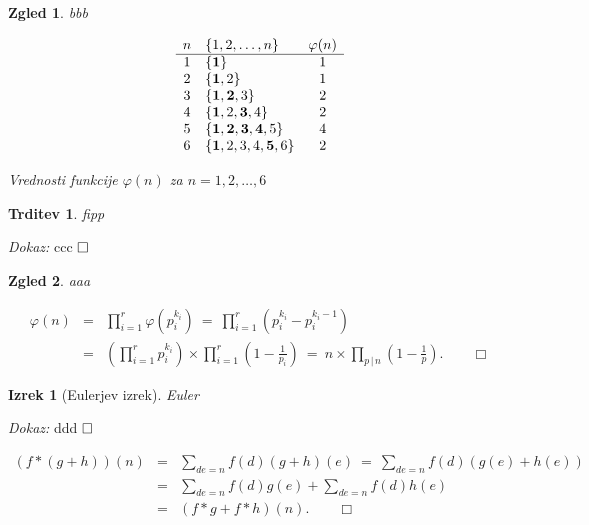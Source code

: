 \documentclass[a4paper,12pt]{article}
\def\qed{$\hfill\Box$}   %
\def\qedm{\qquad\Box}   %
\newtheorem{izrek}{Izrek}
\newtheorem{trditev}{Trditev}
\newtheorem{zgled}{Zgled}
\begin{document}
\begin{zgled}
bbb
\begin{table}[h]
\[
\begin{array}{clc}
 n & \{1,2,\ldots, n\}          & \varphi(n)       \\
 \hline
 1 & \{{\bf 1}\}                    &     1      \\
 2 & \{{\bf 1},2 \}                &     1      \\
 3 & \{{\bf 1,2},3 \}             &     2      \\
 4 & \{{\bf 1},2,{\bf 3},4 \} &     2      \\
 5 & \{{\bf 1,2,3,4},5 \}       &     4      \\
 6 & \{{\bf 1},2,3,4,{\bf 5},6 \} &     2
\end{array}
\] 
\caption{Vrednosti funkcije $\varphi(n)$ za $n = 1,2,\ldots,6$}\label{fi}
\end{table}


\end{zgled}



\begin{trditev}
\label{fipp}
fipp
\end{trditev}

\noindent
{\em Dokaz:\/} ccc
\qed


\begin{zgled}
aaa
\end{zgled}


\begin{eqnarray*}
\varphi(n) &=& \prod_{i=1}^r \varphi\left(p_i^{k_i}\right)
\ =\ \prod_{i=1}^r \left(p_i^{k_i} - p_i^{k_i-1}\right) \\
 &=& \left(\prod_{i=1}^r p_i^{k_i}\right) \times \prod_{i=1}^r \left(1 - \frac{1}{p_i}\right)
\ =\ n \times \prod_{p\,|\,n} \left(1 - \frac{1}{p}\right). \qedm
\end{eqnarray*}


\begin{izrek}[Eulerjev izrek]
Euler
\end{izrek}

\noindent
{\em Dokaz:\/} ddd \qed




\begin{eqnarray*}
(f * (g + h))(n) &=& \sum_{d e = n} f(d)(g+h)(e)
\ =\ \sum_{d e = n} f(d)(g(e)+h(e)) \\
 &=& \sum_{d e = n} f(d)g(e) + \sum_{d e = n} f(d)h(e) \\
 &=& (f * g + f * h)(n). \qedm
\end{eqnarray*}
\end{document}
